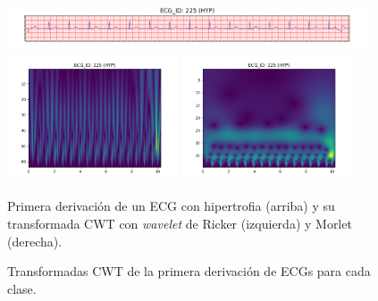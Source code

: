 \begin{figure}[t]
	\includegraphics[width=0.95\textwidth]{Imagenes/Vectorial/Transformadas/HYP/ecg.png}
	\includegraphics[width=0.45\textwidth]{Imagenes/Vectorial/Transformadas/HYP/cwt_ricker.png}
	\includegraphics[width=0.45\textwidth]{Imagenes/Vectorial/Transformadas/HYP/cwt_morlet.png}
	\par Primera derivación de un ECG con hipertrofia (arriba) y su transformada CWT con \emph{wavelet} de Ricker (izquierda) y Morlet (derecha).
	\caption{Transformadas CWT de la primera derivación de ECGs para cada clase.}
\end{figure}